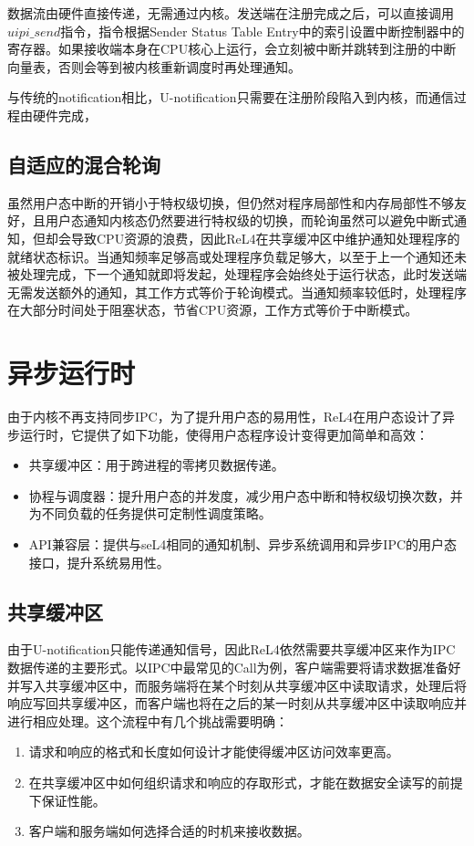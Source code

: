 数据流由硬件直接传递，无需通过内核。发送端在注册完成之后，可以直接调用$uipi\_send$指令，指令根据Sender Status Table Entry中的索引设置中断控制器中的寄存器。如果接收端本身在CPU核心上运行，会立刻被中断并跳转到注册的中断向量表，否则会等到被内核重新调度时再处理通知。

与传统的notification相比，U-notification只需要在注册阶段陷入到内核，而通信过程由硬件完成，

\subsection{自适应的混合轮询}
虽然用户态中断的开销小于特权级切换，但仍然对程序局部性和内存局部性不够友好，且用户态通知内核态仍然要进行特权级的切换，而轮询虽然可以避免中断式通知，但却会导致CPU资源的浪费，因此ReL4在共享缓冲区中维护通知处理程序的就绪状态标识。当通知频率足够高或处理程序负载足够大，以至于上一个通知还未被处理完成，下一个通知就即将发起，处理程序会始终处于运行状态，此时发送端无需发送额外的通知，其工作方式等价于轮询模式。当通知频率较低时，处理程序在大部分时间处于阻塞状态，节省CPU资源，工作方式等价于中断模式。

\section{异步运行时}
由于内核不再支持同步IPC，为了提升用户态的易用性，ReL4在用户态设计了异步运行时，它提供了如下功能，使得用户态程序设计变得更加简单和高效：
\begin{itemize}
  \item 共享缓冲区：用于跨进程的零拷贝数据传递。
  \item 协程与调度器：提升用户态的并发度，减少用户态中断和特权级切换次数，并为不同负载的任务提供可定制性调度策略。
  \item API兼容层：提供与seL4相同的通知机制、异步系统调用和异步IPC的用户态接口，提升系统易用性。
\end{itemize}

\subsection{共享缓冲区}
由于U-notification只能传递通知信号，因此ReL4依然需要共享缓冲区来作为IPC数据传递的主要形式。以IPC中最常见的Call为例，客户端需要将请求数据准备好并写入共享缓冲区中，而服务端将在某个时刻从共享缓冲区中读取请求，处理后将响应写回共享缓冲区，而客户端也将在之后的某一时刻从共享缓冲区中读取响应并进行相应处理。这个流程中有几个挑战需要明确：
\begin{enumerate}
  \item 请求和响应的格式和长度如何设计才能使得缓冲区访问效率更高。
  \item 在共享缓冲区中如何组织请求和响应的存取形式，才能在数据安全读写的前提下保证性能。
  \item 客户端和服务端如何选择合适的时机来接收数据。
\end{enumerate}

